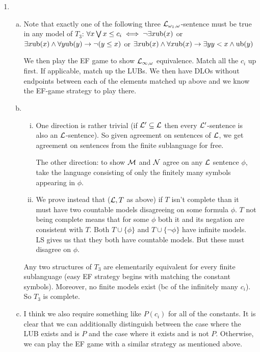 \begin{enumerate}[1.]
\item
  \begin{enumerate}[a)]

    \item Note that exactly one of the following three \(\mathcal{L}_{\omega_1, \omega}\)-sentence must be true in any model of \(T_3\): 
    \(\forall x \bigvee x \leq c_i \iff \neg\exists x \text{ub}(x)\) or
    \(\exists x \text{ub}(x) \land \forall y \text{ub}(y) \to \neg(y \leq x)\) or
    \(\exists x \text{ub}(x) \land \forall x \text{ub}(x) \to \exists y y < x \land \text{ub}(y)\)

    We then play the EF game to show \(\mathcal{L}_{\infty, \omega}\) equivalence. Match all the \(c_i\) up first. If applicable, match up the LUBs.
    We then have DLOs without endpoints between each of the elements matched up above and we know the EF-game strategy to play there.   
    
    \item
      \begin{enumerate}[i)]
        \item One direction is rather trivial (if \(\mathcal{L}' \subseteq \mathcal{L}\) then every \(\mathcal{L}'\)-sentence is also an \(\mathcal{L}\)-sentence). So given agreement on sentences of \(\mathcal{L}\), we get agreement on sentences from the finite sublanguage for free.

The other direction: to show \(\mathcal{M}\) and \(\mathcal{N}\) agree on any \(\mathcal{L}\) sentence \(\phi\), take the language consisting of only the finitely many symbols appearing in \(\phi\). 

        \item We prove instead that (\(\mathcal{L}, T\) as above) if \(T\) isn't complete than it must have two countable models disagreeing on some formula \(\phi\). \(T\) not being complete means that for some \(\phi\) both it and its negation are consistent with \(T\). Both \(T \cup \{\phi\}\) and \(T \cup \{\neg \phi\}\) have infinite models. LS gives us that they both have countable models. But these must disagree on \(\phi\). 

      \end{enumerate}

   Any two structures of \(T_3\) are elementarily equivalent for every finite sublanguage (easy EF strategy begins with matching the constant symbols). Moreover, no finite models exist (bc of the infinitely many \(c_i\)). So \(T_3\) is complete. 

    \item I think we also require something like \(P(c_i)\) for all of the constants. It is clear that we can additionally distinguish between the case where the LUB exists and is \(P\) and the case where it exists and is not \(P\). Otherwise, we can play the EF game with a similar strategy as mentioned above. 


\end{enumerate}
\end{enumerate}
